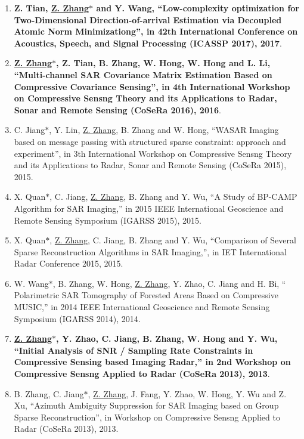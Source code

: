 \documentclass[paper=a4,fontsize=11pt]{scrartcl}
\begin{document}
\begin{enumerate}
\item \textbf{Z. Tian, \underline{Z. Zhang$\ast$} and Y. Wang, ``Low-complexity optimization for Two-Dimensional Direction-of-arrival Estimation via Decoupled Atomic Norm Minimizationg'', in 42th International Conference on Acoustics, Speech, and Signal Processing (ICASSP 2017), 2017}.

\item \textbf{\underline{Z. Zhang$\ast$}, Z. Tian, B. Zhang, W. Hong, W. Hong and L. Li, ``Multi-channel SAR Covariance Matrix Estimation Based on Compressive Covariance Sensing'', in 4th International Workshop on Compressive Sensng Theory and its Applications to Radar, Sonar and Remote Sensing (CoSeRa 2016), 2016}.

\item C. Jiang$\ast$, Y. Lin, \underline{Z. Zhang}, B. Zhang and W. Hong, ``WASAR Imaging based on message passing with structured sparse constraint: approach and experiment'', in 3th International Workshop on Compressive Sensng Theory and its Applications to Radar, Sonar and Remote Sensing (CoSeRa 2015), 2015.

\item X. Quan$\ast$, C. Jiang, \underline{Z. Zhang}, B. Zhang and Y. Wu, ``A Study of BP-CAMP Algorithm for SAR Imaging,'' in 2015 IEEE International Geoscience and Remote Sensing Symposium (IGARSS 2015), 2015.

\item X. Quan$\ast$, \underline{Z. Zhang}, C. Jiang, B. Zhang and Y. Wu, ``Comparison of Several Sparse Reconstruction Algorithms in SAR Imaging,'', in IET International Radar Conference 2015, 2015.

\item W. Wang$\ast$, B. Zhang, W. Hong, \underline{Z. Zhang}, Y. Zhao, C. Jiang and H. Bi, `` Polarimetric SAR Tomography of Forested Areas Based on Compressive MUSIC,'' in 2014 IEEE International Geoscience and Remote Sensing Symposium (IGARSS 2014), 2014.
	
\item \textbf{\underline{Z. Zhang$\ast$}, Y. Zhao, C. Jiang, B. Zhang, W. Hong and Y. Wu, ``Initial Analysis of SNR / Sampling Rate Constraints in Compressive Sensing based Imaging Radar,'' in 2nd Workshop on Compressive Sensng Applied to Radar (CoSeRa 2013), 2013}.

\item B. Zhang, C. Jiang$\ast$, \underline{Z. Zhang}, J. Fang, Y. Zhao, W. Hong, Y. Wu and Z. Xu, ``Azimuth Ambiguity Suppression for SAR Imaging based on Group Sparse Reconstruction'', in Workshop on Compressive Sensng Applied to Radar (CoSeRa 2013), 2013.
	

\end{enumerate}
\end{document}
